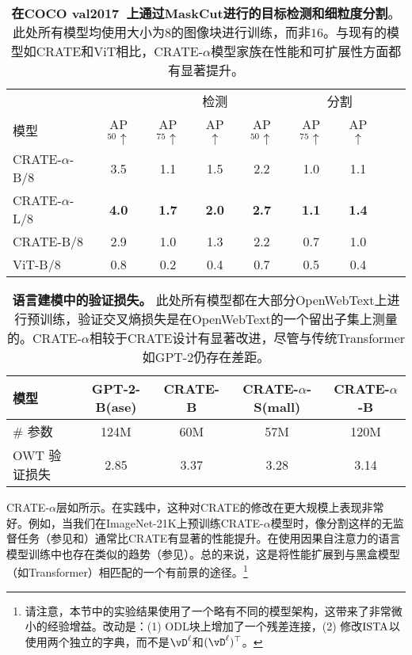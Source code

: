 \documentclass[../../book-main.tex]{subfiles}
\begin{document}
\begin{table}
    \centering
    \begin{tabular}{@{}lcccccccc@{}}
    \toprule
     &  & \multicolumn{3}{c}{检测} &  \multicolumn{3}{c}{分割} \\ 
    模型 & AP$_{50} \uparrow $ & AP$_{75} \uparrow $ & AP $\uparrow$ & AP$_{50} \uparrow$ & AP$_{75} \uparrow $ & AP $\uparrow$ \\ 
    \midrule
    \midrule
    CRATE-\(\alpha\)-B/8 & 3.5 & 1.1 & 1.5 & 2.2 & 1.0 & 1.1 \\
    CRATE-\(\alpha\)-L/8 & \textbf{4.0} & \textbf{1.7} & \textbf{2.0} & \textbf{2.7} & \textbf{1.1} & \textbf{1.4} \\
    \midrule
    \color{gray}CRATE-B/8 & \color{gray}2.9 & \color{gray}1.0 & \color{gray}1.3 & \color{gray}2.2 & \color{gray}0.7 & \color{gray}1.0 \\
    \color{gray}ViT-B/8 & \color{gray}0.8 & \color{gray}0.2 & \color{gray}0.4 & \color{gray}0.7 & \color{gray}0.5 & \color{gray}0.4 \\
    \bottomrule
    \end{tabular}
    \caption{\small \textbf{在COCO val2017~\citep{lin2014microsoft}上通过MaskCut进行的目标检测和细粒度分割}。此处所有模型均使用大小为\(8\)的图像块进行训练，而非\(16\)。与现有的模型如CRATE和ViT相比，CRATE-\(\alpha\)模型家族在性能和可扩展性方面都有显著提升。}
    \label{tab:crate_alpha_detection_segmentation}
\end{table}

\begin{table}
    \centering 
    \begin{tabular}{@{}lcccc@{}}
    \toprule
    模型 & GPT-2-B(ase) & CRATE-B & CRATE-\(\alpha\)-S(mall) & CRATE-\(\alpha\)-B \\ 
    \midrule
    \midrule
    \# 参数 & 124M & 60M & 57M & 120M \\
    OWT 验证损失 & 2.85 & 3.37 & 3.28 & 3.14 \\
    \bottomrule
    \end{tabular}
    \caption{\small\textbf{语言建模中的验证损失。} 此处所有模型都在大部分OpenWebText上进行预训练，验证交叉熵损失是在OpenWebText的一个留出子集上测量的。CRATE-\(\alpha\)相较于CRATE设计有显著改进，尽管与传统Transformer如GPT-2仍存在差距。}
    \label{tab:crate_alpha_lm}
\end{table}

CRATE-\(\alpha\)层如所示。在实践中，这种对CRATE的修改在更大规模上表现非常好。例如，当我们在ImageNet-21K上预训练CRATE-\(\alpha\)模型时，像分割这样的无监督任务（参见和）通常比CRATE有显著的性能提升。在使用因果自注意力的语言模型训练中也存在类似的趋势（参见）。总的来说，这是将性能扩展到与黑盒模型（如Transformer）相匹配的一个有前景的途径。\footnote{请注意，本节中的实验结果使用了一个略有不同的模型架构，这带来了非常微小的经验增益。改动是：(1) ODL块上增加了一个残差连接，(2) 修改\(\operatorname{ISTA}\)以使用两个独立的字典，而不是\(\vD^{\ell}\)和\((\vD^{\ell})^{\top}\)。}
\end{document}
